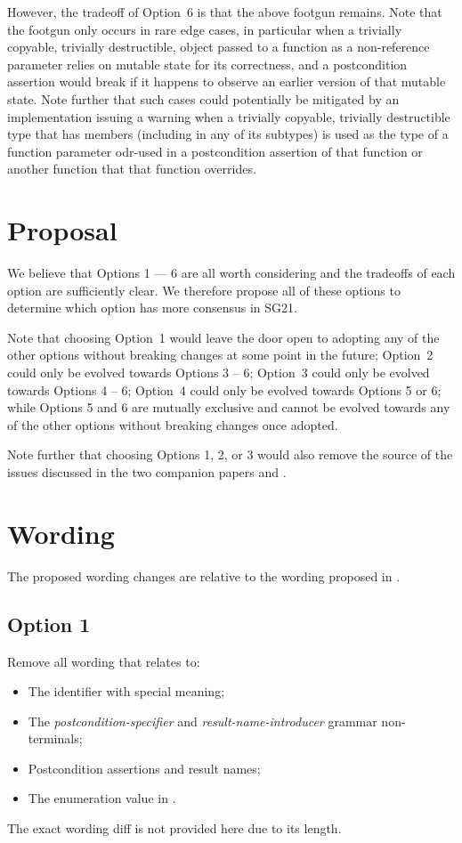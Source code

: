 However, the tradeoff of Option~6 is that the above footgun remains. Note that the footgun only occurs in rare edge cases, in particular when a trivially copyable, trivially destructible,  object passed to a function as a non-reference parameter relies on mutable state for its correctness, and a postcondition assertion would break if it happens to observe an earlier version of that mutable state. Note further that such cases could potentially be mitigated by an implementation issuing a warning when a trivially copyable, trivially destructible type that has  members (including in any of its subtypes) is used as the type of a function parameter odr-used in a postcondition assertion of that function or another function that that function overrides.

\section{Proposal}

We believe that Options 1 --- 6 are all worth considering and the tradeoffs of each option are sufficiently clear. We therefore propose all of these options to determine which option has more consensus in SG21. 

Note that choosing Option~1 would leave the door open to adopting any of the other options without breaking changes at some point in the future; Option~2 could only be evolved towards Options 3 -- 6; Option~3 could only be evolved towards Options 4 -- 6; Option~4 could only be evolved towards Options 5 or 6; while Options 5 and 6 are mutually exclusive and cannot be evolved towards any of the other options without breaking changes once adopted.

Note further that choosing Options 1, 2, or 3 would also remove the source of the issues discussed in the two companion papers \cite{D3484R1} and \cite{D3489R0}.

\section{Wording}

The proposed wording changes are relative to the wording proposed in \cite{P2900R10}.

\subsection{Option 1}

Remove all wording that relates to:
\begin{itemize}
\item The  identifier with special meaning;
\item The \emph{postcondition-specifier} and \emph{result-name-introducer} grammar non-terminals;
\item Postcondition assertions and result names;
\item The  enumeration value in .
\end{itemize}
The exact wording diff is not provided here due to its length.

